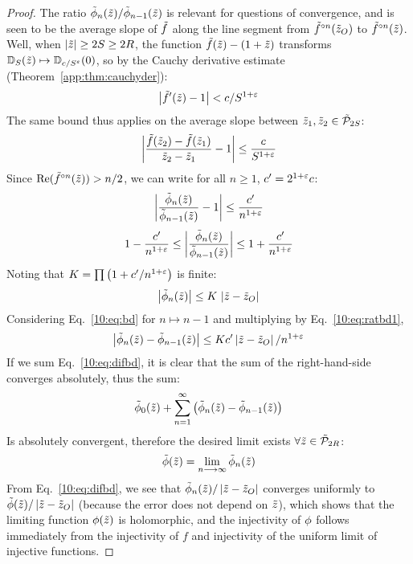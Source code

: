 \documentclass[../main.tex]{subfiles}
\begin{document}
\begin{proof}
    The ratio $\tilde{\phi}_n(\tilde{z})/\tilde{\phi}_{n-1}(\tilde{z})$ is relevant for questions of convergence, and is seen to be the average slope of $\tilde{f}$ along the line segment from $\tilde{f}^{\circ n}(\tilde{z}_O)$ to $\tilde{f}^{\circ n}(\tilde{z})$. Well, when $\left|\tilde{z}\right|\ge 2S \ge 2R$, the function $\tilde{f}(\tilde{z})-(1+\tilde{z})$ transforms $\mathbb{D}_S(\tilde{z})\mapsto \mathbb{D}_{c/S^{\varepsilon}}(0)$, so by the Cauchy derivative estimate (Theorem~\ref{app:thm:cauchyder}):
    \begin{equation*}
        \left|\tilde{f}'(\tilde{z})-1\right|<c/S^{1+\varepsilon}
    \end{equation*}
    The same bound thus applies on the average slope between $\tilde{z}_1, \tilde{z}_2\in \tilde{\mathcal{P}}_{2S}$:
    \begin{equation*}
        \left|\frac{\tilde{f}(\tilde{z}_2)-\tilde{f}(\tilde{z}_1)}{\tilde{z}_2-\tilde{z}_1}-1\right|\le \frac{c}{S^{1+\varepsilon}} 
    \end{equation*}
    Since $\mathrm{Re}(\tilde{f}^{\circ n}(\tilde{z}))>n/2$, we can write for all $n\ge 1$, $c'=2^{1+\varepsilon} c$:
    \begin{equation}
        \label{10:eq:ratbd1}
        \left|\frac{\tilde{\phi}_n(\tilde{z})}{\tilde{\phi}_{n-1}(\tilde{z})} - 1\right|\le \frac{c'}{n^{1+\varepsilon}}
    \end{equation}    
    \begin{equation*}
        1-\frac{c'}{n^{1+\varepsilon}} \le 
        \left|\frac{\tilde{\phi}_n(\tilde{z})}{\tilde{\phi}_{n-1}(\tilde{z})}\right| \le 1+\frac{c'}{n^{1+\varepsilon}}
    \end{equation*}    
    Noting that $K=\prod\left(1+c'/n^{1+\varepsilon}\right)$ is finite:
    \begin{equation}
        \label{10:eq:bd}
        \left|\tilde{\phi}_n(\tilde{z})\right|\le K\, \left|\tilde{z}-\tilde{z}_O\right|
    \end{equation}
    Considering Eq.~\ref{10:eq:bd} for $n\mapsto n-1$ and multiplying by Eq.~\ref{10:eq:ratbd1},
    \begin{equation}
        \label{10:eq:difbd}
        \left|\tilde{\phi}_n(\tilde{z})-\tilde{\phi}_{n-1}(\tilde{z})\right|\le Kc'\left|\tilde{z}-\tilde{z}_O\right|/n^{1+\varepsilon} 
    \end{equation}
    If we sum Eq.~\ref{10:eq:difbd}, it is clear that the sum of the right-hand-side converges absolutely, thus the sum:
    \begin{equation*}
        \tilde{\phi}_0(\tilde{z})+\sum_{n=1}^\infty \left({\tilde{\phi}_n(\tilde{z})-\tilde{\phi}_{n-1}(\tilde{z})}\right)
    \end{equation*}
    Is absolutely convergent, therefore the desired limit exists $\forall \tilde{z}\in\tilde{\mathcal{P}}_{2R}$: 
    \begin{equation*}
        \tilde{\phi}(\tilde{z})=\lim_{n\longrightarrow\infty}\tilde{\phi}_n(\tilde{z})
    \end{equation*}
    From Eq.~\ref{10:eq:difbd}, we see that $\tilde{\phi}_n(\tilde{z})/\left|\tilde{z}-\tilde{z}_O\right|$ converges uniformly to $\tilde{\phi}(\tilde{z})/\left|\tilde{z}-\tilde{z}_O\right|$ (because the error does not depend on $\tilde{z}$), which shows that the limiting function $\phi(\tilde{z})$ is holomorphic, and the injectivity of $\phi$ follows immediately from the injectivity of $f$ and injectivity of the uniform limit of injective functions. 
\end{proof}
\end{document}
